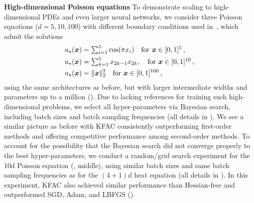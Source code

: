 \textbf{High-dimensional Poisson equations}
To demonstrate scaling to high-dimensional PDEs and even larger neural networks, we consider three Poisson equations ($d=5,10,100$) with different boundary conditions used in~\cite{yu2018deep, muller2023achieving}, which admit the solutions
\begin{align}\label{eq:solutions_poisson}
  \begin{split}
    u_\star({\bm{x}})
    &=
      \textstyle
      \sum_{i=1}^5 \cos(\pi x_i) \quad \text{for } {\bm{x}}\in [0,1]^{5}\,,
    \\
    u_\star({\bm{x}})
    &=
      \textstyle
      \sum_{k=1}^5 x_{2k-1}x_{2k},  \quad \text{for } {\bm{x}}\in [0,1]^{10}\,,
    \\
    u_\star({\bm{x}})
    &=
     \lVert {\bm{x}} \rVert_2^2 \quad \text{for } {\bm{x}}\in [0,1]^{100}\,,
  \end{split}
\end{align}
using the same architectures as before, but with larger intermediate widths and parameters up to a million ().
Due to lacking references for training such high-dimensional problems, we select all hyper-parameters via Bayesian search, including batch sizes and batch sampling frequencies (all details in ).
We see a similar picture as before with KFAC consistently outperforming first-order methods and offering competitive performance among second-order methods.
To account for the possibility that the Bayesian search did not converge properly to the best hyper-parameters, we conduct a random/grid search experiment for the 10d Poisson equation (, middle), using similar batch sizes and same batch sampling frequencies as for the $(4+1)$d heat equation (all details in ).
In this experiment, KFAC also achieved similar performance than Hessian-free and outperformed SGD, Adam, and LBFGS ().

